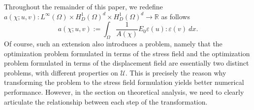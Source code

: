 \documentclass{amsart}
\begin{document}
Throughout the remainder of this paper, we redefine \( a(\chi; u, v): L^\infty(\Omega) \times H_D^1(\Omega)^d \times H_D^1(\Omega)^d \to \mathbb{R} \) as follows
\begin{equation}
    a(\chi; u, v):=\int_\Omega\dfrac{1}{A(\chi)}{E}_0\varepsilon(u):\varepsilon(v)\ dx.
\end{equation}
Of course, such an extension also introduces a problem, namely that the optimization problem formulated in terms of the stress field and the optimization problem formulated in terms of the displacement field are essentially two distinct problems, with different properties on \(\mathcal{U}\). This is precisely the reason why transforming the problem to the stress field formulation yields better numerical performance. However, in the section on theoretical analysis, we need to clearly articulate the relationship between each step of the transformation.
\end{document}
